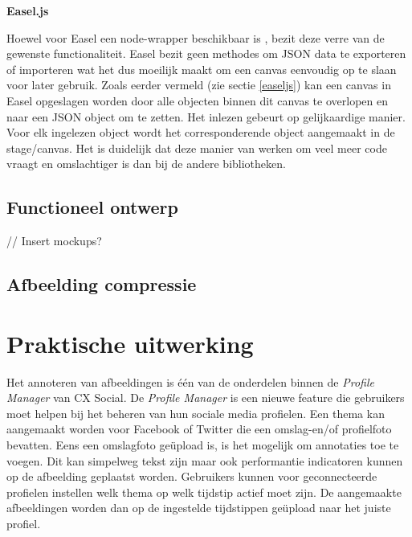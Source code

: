 \textbf{Easel.js} 

Hoewel voor Easel een node-wrapper beschikbaar is %
, bezit deze verre van de gewenste functionaliteit. Easel bezit geen methodes om JSON data te exporteren of importeren wat het dus moeilijk maakt om een canvas eenvoudig op te slaan voor later gebruik. Zoals eerder vermeld (zie sectie \ref{easeljs}) kan een canvas in Easel opgeslagen worden door alle objecten binnen dit canvas te overlopen en naar een JSON object om te zetten. Het inlezen gebeurt op gelijkaardige manier. Voor elk ingelezen object wordt het corresponderende object aangemaakt in de stage/canvas. Het is duidelijk dat deze manier van werken om veel meer code vraagt en omslachtiger is dan bij de andere bibliotheken.  


\newpage
\section{Functioneel ontwerp}
// Insert mockups?
\newpage
\section{Afbeelding compressie}

\chapter{Praktische uitwerking}
\vspace{-3cm}
Het annoteren van afbeeldingen is \'{e}\'{e}n van de onderdelen binnen de \textit{Profile Manager} van CX Social. De \textit{Profile Manager} is een nieuwe feature die gebruikers moet helpen bij het beheren van hun sociale media profielen. Een thema kan aangemaakt worden voor Facebook of Twitter die een omslag-en/of profielfoto bevatten. Eens een omslagfoto ge\"{u}pload is, is het mogelijk om annotaties toe te voegen. Dit kan simpelweg tekst zijn maar ook performantie indicatoren kunnen op de afbeelding geplaatst worden. Gebruikers kunnen voor geconnecteerde profielen instellen welk thema op welk tijdstip actief moet zijn. De aangemaakte afbeeldingen worden dan op de ingestelde tijdstippen ge\"{u}pload naar het juiste profiel. 



